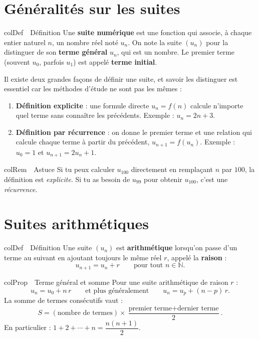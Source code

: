 \documentclass[11pt,a4paper]{article}
\newenvironment{definition}[1][Définition]
  {\begin{fiche}{colDef}{\ding{110}~~#1}}{\end{fiche}}
\newenvironment{propriete}[1][Propriété]
  {\begin{fiche}{colProp}{\ding{72}~~#1}}{\end{fiche}}
\newenvironment{remarque}[1][Remarque]
  {\begin{fiche}{colRem}{\ding{43}~~#1}}{\end{fiche}}
\begin{document}
\section{Généralités sur les suites}

\begin{definition}
Une \textbf{suite numérique} est une fonction qui associe, à chaque entier naturel $n$, un nombre réel noté $u_n$. On note la suite $(u_n)$ pour la distinguer de son \textbf{terme général} $u_n$, qui est un nombre. Le premier terme (souvent $u_0$, parfois $u_1$) est appelé \textbf{terme initial}.
\end{definition}

Il existe deux grandes façons de définir une suite, et savoir les distinguer est essentiel car les méthodes d'étude ne sont pas les mêmes :

\begin{enumerate}[leftmargin=8mm, itemsep=1mm]
  \item \textbf{Définition explicite} : une formule directe $u_n = f(n)$ calcule n'importe quel terme sans connaître les précédents. Exemple : $u_n = 2n + 3$.
  \item \textbf{Définition par récurrence} : on donne le premier terme et une relation qui calcule chaque terme à partir du précédent, $u_{n+1} = f(u_n)$. Exemple : $u_0 = 1$ et $u_{n+1} = 2u_n + 1$.
\end{enumerate}

\begin{remarque}[Astuce]
Si tu peux calculer $u_{100}$ directement en remplaçant $n$ par $100$, la définition est \emph{explicite}. Si tu as besoin de $u_{99}$ pour obtenir $u_{100}$, c'est une \emph{récurrence}.
\end{remarque}

\section{Suites arithmétiques}

\begin{definition}
Une suite $(u_n)$ est \textbf{arithmétique} lorsqu'on passe d'un terme au suivant en ajoutant toujours le même réel $r$, appelé la \textbf{raison} :
\[
  u_{n+1} = u_n + r \qquad \text{pour tout } n \in \mathbb{N}.
\]
\end{definition}

\begin{propriete}[Terme général et somme]
Pour une suite arithmétique de raison $r$ :
\[
  u_n = u_0 + n\,r
  \qquad\text{et plus généralement}\qquad
  u_n = u_p + (n - p)\,r.
\]
La somme de termes consécutifs vaut :
\[
  S = (\text{nombre de termes}) \times \frac{\text{premier terme} + \text{dernier terme}}{2}.
\]
En particulier : $1 + 2 + \cdots + n = \dfrac{n(n+1)}{2}$.
\end{propriete}
\end{document}
